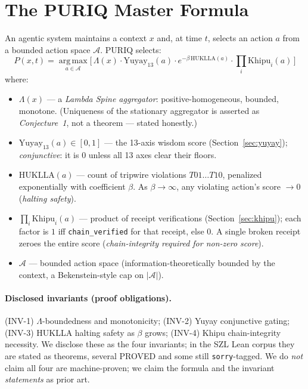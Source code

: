 \documentclass[10pt,conference]{IEEEtran}
\begin{document}
\section{The PURIQ Master Formula}
An agentic system maintains a context $x$ and, at time $t$, selects an action $a$ from a
bounded action space $\mathcal{A}$. PURIQ selects:
\begin{equation}
P(x,t) = \operatorname*{arg\,max}_{a \in \mathcal{A}}
\Big[\, \Lambda(x)\cdot \mathrm{Yuyay}_{13}(a)\cdot
e^{-\beta\, \mathrm{HUKLLA}(a)}\cdot \prod_i \mathrm{Khipu}_i(a) \,\Big]
\label{eq:master}
\end{equation}
where:
\begin{itemize}[leftmargin=1.2em]
\item $\Lambda(x)$ --- a \emph{Lambda Spine aggregator}: positive-homogeneous, bounded,
monotone. (Uniqueness of the stationary aggregator is asserted as \emph{Conjecture~1},
not a theorem --- stated honestly.)
\item $\mathrm{Yuyay}_{13}(a) \in [0,1]$ --- the 13-axis wisdom score
(Section~\ref{sec:yuyay}); \emph{conjunctive}: it is $0$ unless all 13 axes clear their
floors.
\item $\mathrm{HUKLLA}(a)$ --- count of tripwire violations $T01\ldots T10$, penalized
exponentially with coefficient $\beta$. As $\beta\!\to\!\infty$, any violating action's
score $\to 0$ (\emph{halting safety}).
\item $\prod_i \mathrm{Khipu}_i(a)$ --- product of receipt verifications
(Section~\ref{sec:khipu}); each factor is $1$ iff \texttt{chain\_verified} for that
receipt, else $0$. A single broken receipt zeroes the entire score
(\emph{chain-integrity required for non-zero score}).
\item $\mathcal{A}$ --- bounded action space (information-theoretically bounded by the
context, a Bekenstein-style cap on $|\mathcal{A}|$).
\end{itemize}

\paragraph{Disclosed invariants (proof obligations).}
(INV-1) $\Lambda$-boundedness and monotonicity; (INV-2) Yuyay conjunctive gating;
(INV-3) HUKLLA halting safety as $\beta$ grows; (INV-4) Khipu chain-integrity
necessity. We disclose these as the four invariants; in the SZL Lean corpus they are
stated as theorems, several PROVED and some still \texttt{sorry}-tagged. We do
\emph{not} claim all four are machine-proven; we claim the formula and the invariant
\emph{statements} as prior art.
\end{document}
